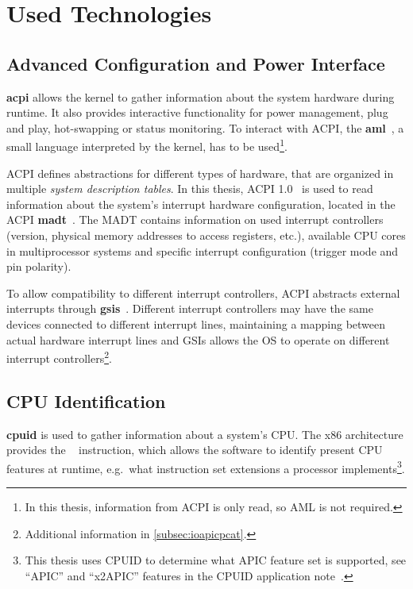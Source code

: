 \section{Used Technologies}
\label{sec:technologies}

\subsection{Advanced Configuration and Power Interface}
\label{subsec:acpi}

\textbf{\gls{acpi}} allows the kernel to gather information about the system hardware during
runtime. It also provides interactive functionality for power management, plug and play,
hot-swapping or status monitoring. To interact with ACPI, the
\textbf{\gls{aml}}~\cite[sec.~16]{acpi1}, a small language interpreted by the kernel, has to be
used\footnote{In this thesis, information from ACPI is only read, so AML is not required.}.

ACPI defines abstractions for different types of hardware, that are organized in multiple
\textit{system description tables}. In this thesis, ACPI 1.0~\cite{acpi1} is used to read
information about the system's interrupt hardware configuration, located in the ACPI
\textbf{\gls{madt}}~\cite[sec.~5.2.8]{acpi1}. The MADT contains information on used interrupt
controllers (version, physical memory addresses to access registers, etc.), available CPU cores in
multiprocessor systems and specific interrupt configuration (trigger mode and pin polarity).

To allow compatibility to different interrupt controllers, ACPI abstracts external interrupts
through \textbf{\glspl{gsi}}~\cite[sec.~5.2.9]{acpi1}. Different interrupt controllers may have the
same devices connected to different interrupt lines, maintaining a mapping between actual hardware
interrupt lines and GSIs allows the OS to operate on different interrupt
controllers\footnote{Additional information in \autoref{subsec:ioapicpcat}.}.

\subsection{CPU Identification}
\label{subsec:cpuid}

\textbf{\gls{cpuid}} is used to gather information about a system's CPU. The x86 architecture
provides the ~\cite{x86isa} instruction, which allows the software to identify present
CPU features at runtime, e.g.\ what instruction set extensions a processor implements\footnote{This
  thesis uses CPUID to determine what APIC feature set is supported, see ``APIC'' and ``x2APIC''
  features in the CPUID application note~\cite[sec.~5.1.2]{cpuid}.}.

